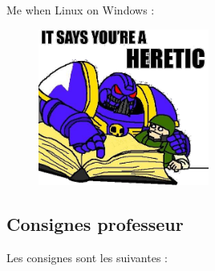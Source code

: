 \documentclass{article}
\begin{document}
	\begin{center}Me when Linux on Windows :
	\end{center}
	\begin{figure}[h]
		\centering
		\includegraphics[width=0.5\textwidth]{meme.png}
		
		\label{fig:meme}
	\end{figure}
	\newpage
	
	
	
	
	\subsection{Consignes professeur}
	
	Les consignes sont les suivantes : 
	
\end{document}
